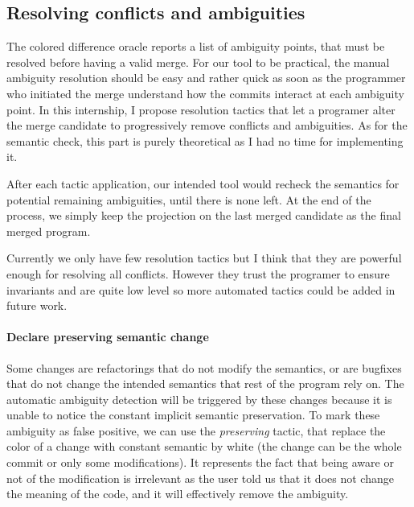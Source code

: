\documentclass[a4paper,11pt]{article}
\newcommand\yrg[1]{{\color{red}{(\textbf{YRG:} #1)}}}
\begin{document}
\yrg{What is the meaning of the ! here?}

\subsection{Resolving conflicts and ambiguities}
The colored difference oracle reports a list of ambiguity points, that
must be resolved before having a valid merge. For our tool to be
practical, the manual ambiguity resolution should be easy and rather
quick as soon as the programmer who initiated the merge understand how
the commits interact at each ambiguity point. In this internship, I
propose resolution tactics that let a programer alter the merge
candidate to progressively remove conflicts and ambiguities. As for
the semantic check, this part is purely theoretical as I had no time
for implementing it.

After each tactic application, our intended tool would recheck the
semantics for potential remaining ambiguities, until there is none
left. At the end of the process, we simply keep the projection on the
last merged candidate as the final merged program.

Currently we only have few resolution tactics but I think that they
are powerful enough for resolving all conflicts. However they trust
the programer to ensure invariants and are quite low level so more
automated tactics could be added in future work.

\paragraph{Declare preserving semantic change}
%
Some changes are refactorings that do not modify the semantics, or are
bugfixes that do not change the intended semantics that rest of the
program rely on.  The automatic ambiguity detection will be triggered
by these changes because it is unable to notice the constant implicit
semantic preservation. To mark these ambiguity as false positive, we
can use the \textit{preserving} tactic, that replace the color of a
change with constant semantic by white (the change can be the whole
commit or only some modifications). It represents the fact that being
aware or not of the modification is irrelevant as the user told us
that it does not change the meaning of the code, and it will
effectively remove the ambiguity.
\end{document}
